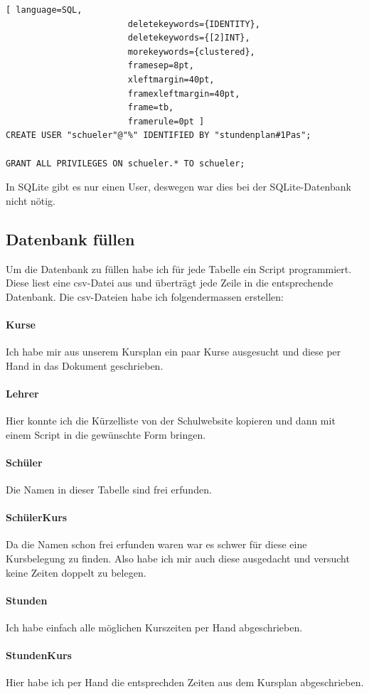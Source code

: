 \documentclass[a4paper, 12pt]{article}
\theoremstyle{plain}
\theoremstyle{definition}
\begin{document}
	\begin{lstlisting}[ language=SQL,
	                    deletekeywords={IDENTITY},
	                    deletekeywords={[2]INT},
	                    morekeywords={clustered},
	                    framesep=8pt,
	                    xleftmargin=40pt,
	                    framexleftmargin=40pt,
	                    frame=tb,
	                    framerule=0pt ]	
CREATE USER "schueler"@"%" IDENTIFIED BY "stundenplan#1Pas";

GRANT ALL PRIVILEGES ON schueler.* TO schueler;\end{lstlisting}	
	In SQLite gibt es nur einen User, deswegen war dies bei der SQLite-Datenbank nicht nötig.
	\subsection{Datenbank füllen}
	Um die Datenbank zu füllen habe ich für jede Tabelle ein Script programmiert. Diese liest eine csv-Datei aus und überträgt jede Zeile in die entsprechende Datenbank. Die csv-Dateien habe ich folgendermassen erstellen:
	\paragraph{Kurse} Ich habe mir aus unserem Kursplan ein paar Kurse ausgesucht und diese per Hand in das Dokument geschrieben.
	\paragraph{Lehrer} Hier konnte ich die Kürzelliste von der Schulwebsite kopieren und dann mit einem Script in die gewünschte Form bringen.
	\paragraph{Schüler} Die Namen in dieser Tabelle sind frei erfunden.
	\paragraph{SchülerKurs} Da die Namen schon frei erfunden waren war es schwer für diese eine Kursbelegung zu finden. Also habe ich mir auch diese ausgedacht und versucht keine Zeiten doppelt zu belegen.
	\paragraph{Stunden} Ich habe einfach alle möglichen Kurszeiten per Hand abgeschrieben.
	\paragraph{StundenKurs} Hier habe ich per Hand die entsprechden Zeiten aus dem Kursplan abgeschrieben.
\end{document}
